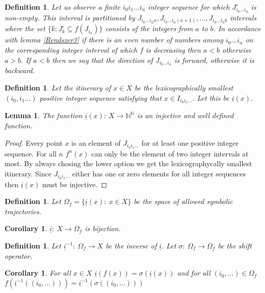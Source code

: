 \documentclass{article}
\newtheorem{lemma}[theorem]{Lemma}
\newtheorem{cor}[theorem]{Corollary}
\newtheorem{defin}[theorem]{Definition}
\begin{document}
\begin{defin}
Let us observe a finite $i_0i_1...i_n$ integer sequence for which $J_{i_0...i_n}^\circ$ is non-empty. This interval is partitioned by $J_{i_0...i_na}, J_{i_0...i_n(a+1)}, ... ,J_{i_0...i_nb}$ intervals where the set $\{k: J_k^\circ \subseteq f(J_{i_n})\}$ consists of the integers from $a$ to $b$. In accordance with lemma \ref{Rendszer3} if there is an even number of numbers among $i_0 ... i_n$ on the corresponding integer interval of which $f$ is decreasing then $a<b$ otherwise $a>b$. If $a<b$ then we say that the direction of $J_{i_0...i_n}$ is forward, otherwise it is backward.
\end{defin}

\begin{defin}
Let the itinerary of $x\in X$ be the lexicographically smallest $(i_0, i_1 ...)$ positive integer sequence satisfying that $x \in I_{i_0i_1...}$. Let this be $\underline{i}(x)$.
\end{defin}

\begin{lemma}
The function $\underline{i}(x): \: X \rightarrow \mathbb{N}^ \mathbb{N}$ is an injective and well defined function.
\end{lemma}

\begin{proof}
Every point $x$ is an element of $J_{i_0i_1...}$ for at least one positive integer sequence. For all $n$ $f^n(x)$ can only be the element of two integer intervals at most. By always chosing the lower option we get the lexicographycally smallest itinerary. Since $J_{i_0i_1...}$ either has one or zero elements for all integer sequences then $\underline{i}(x)$ must be injective.
\end{proof}

\begin{defin}
Let $\Omega_f = \{\underline{i}(x):\: x \in X\}$ be the space of allowed symbolic trajectories.
\end{defin}

\begin{cor}
$\underline{i}:\: X \rightarrow \Omega_f$ is bijection.
\end{cor}

\begin{defin}
Let $\underline{i}^{-1}:\:  \Omega_f \rightarrow X$ be the inverse of $\underline{i}$. Let $\sigma : \:\Omega_f \rightarrow \Omega_f $ be the shift operator.
\end{defin}

\begin{cor}
For all $x \in X$ $\underline{i}(f(x)) = \sigma(\underline{i}(x))$ and for all $(i_0,...) \in \Omega_f$ $f(\underline{i}^{-1}((i_0,...)))=\underline{i}^{-1}(\sigma((i_0,...)))$
\end{cor}
\end{document}
